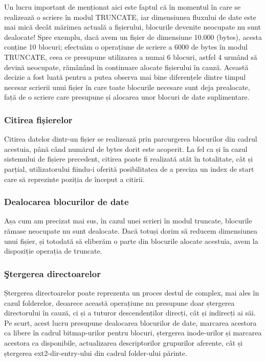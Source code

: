 Un lucru important de menționat aici este faptul că în momentul în care se realizează o scriere în modul TRUNCATE, iar dimensiunea fluxului de date este mai mică decât mărimea actuală a fișierului, blocurile devenite neocupate nu sunt dealocate! Spre exemplu, dacă avem un fișier de dimensiune 10.000 (bytes), acesta conține 10 blocuri; efectuăm o operațiune de scriere a 6000 de bytes în modul TRUNCATE, ceea ce presupune utilizarea a numai 6 blocuri, astfel 4 urmând să devină neocupate, rămânând în continuare alocate fișierului în cauză. Această decizie a fost luată pentru a putea observa mai bine diferențele dintre timpul necesar scrierii unui fișier în care toate blocurile necesare sunt deja prealocate, față de o scriere care presupune și alocarea unor blocuri de date suplimentare.

\subsubsection{Citirea fișierelor}

Citirea datelor dintr-un fișier se realizează prin parcurgerea blocurilor din cadrul acestuia, până când numărul de bytes dorit este acoperit. La fel ca și în cazul sistemului de fișiere precedent, citirea poate fi realizată atât în totalitate, cât și parțial, utilizatorului fiindu-i oferită posibilitatea de a preciza un index de start care să reprezinte poziția de început a citirii.

\subsubsection{Dealocarea blocurilor de date}

Așa cum am precizat mai sus, în cazul unei scrieri în modul truncate, blocurile rămase neocupate nu sunt dealocate. Dacă totuși dorim să reducem dimensiunea unui fișier, și totodată să eliberăm o parte din blocurile alocate acestuia, avem la dispoziție operația de truncate.

\subsubsection{Ştergerea directoarelor}

Ștergerea directoarelor poate reprezenta un proces destul de complex, mai ales în cazul folderelor, deoarece această operațiune nu presupune doar ștergerea directorului în cauză, ci și a tuturor descendenților direcți, cât și indirecți ai săi. Pe scurt, acest lucru presupune dealocarea blocurilor de date, marcarea acestora ca libere în cadrul bitmap-urilor pentru blocuri, ștergerea inode-urilor și marcarea acestora ca disponibile, actualizarea descriptorilor grupurilor aferente, cât și ștergerea ext2-dir-entry-ului din cadrul folder-ului părinte.

